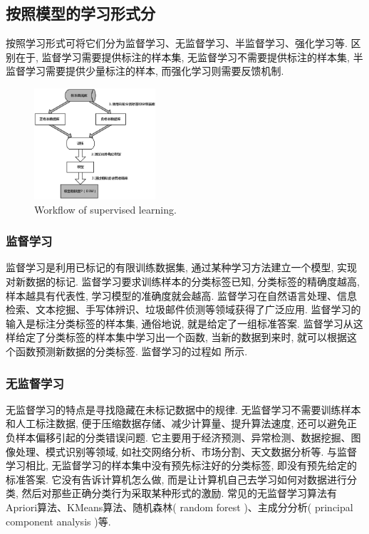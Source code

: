 \documentclass[lang=cn,11pt,a4paper]{elegantpaper}
\begin{document}
\subsection{按照模型的学习形式分}
按照学习形式可将它们分为监督学习、无监督学习、半监督学习、强化学习等. 区别在于, 监督学习需要提供标注的样本集, 无监督学习不需要提供标注的样本集, 半监督学习需要提供少量标注的样本, 而强化学习则需要反馈机制. 
\begin{figure}[htbp]
	\centering
	\hspace{45pt}\includegraphics[width=0.4\textwidth]{SL}
  	\caption{Workflow of supervised learning.\label{fig:SL}}
\end{figure}
\subsubsection*{监督学习}
监督学习是利用已标记的有限训练数据集, 通过某种学习方法建立一个模型, 实现对新数据的标记. 监督学习要求训练样本的分类标签已知, 分类标签的精确度越高, 样本越具有代表性, 学习模型的准确度就会越高. 监督学习在自然语言处理、信息检索、文本挖掘、手写体辨识、垃圾邮件侦测等领域获得了广泛应用. 监督学习的输入是标注分类标签的样本集, 通俗地说, 就是给定了一组标准答案. 监督学习从这样给定了分类标签的样本集中学习出一个函数, 当新的数据到来时, 就可以根据这个函数预测新数据的分类标签. 监督学习的过程如 所示. 
\subsubsection*{无监督学习}
无监督学习的特点是寻找隐藏在未标记数据中的规律. 无监督学习不需要训练样本和人工标注数据, 便于压缩数据存储、减少计算量、提升算法速度, 还可以避免正负样本偏移引起的分类错误问题. 它主要用于经济预测、异常检测、数据挖掘、图像处理、模式识别等领域, 如社交网络分析、市场分割、天文数据分析等. 与监督学习相比, 无监督学习的样本集中没有预先标注好的分类标签, 即没有预先给定的标准答案. 它没有告诉计算机怎么做, 而是让计算机自己去学习如何对数据进行分类, 然后对那些正确分类行为采取某种形式的激励. 常见的无监督学习算法有Apriori算法、KMeans算法、随机森林( random forest )、主成分分析( principal component analysis )等. 
\end{document}
